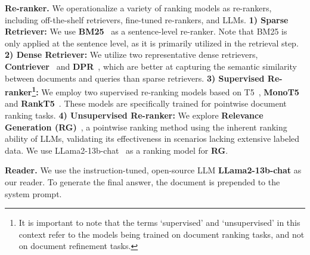 \noindent\textbf{Re-ranker.} 
We operationalize a variety of ranking models as re-rankers, including off-the-shelf retrievers, fine-tuned re-rankers, and LLMs.
\textbf{1) Sparse Retriever:} We use \textbf{BM25}~\cite{bm25} as a sentence-level re-ranker. Note that BM25 is only applied at the sentence level, as it is primarily utilized in the retrieval step.
\textbf{2) Dense Retriever:} We utilize two representative dense retrievers, \textbf{Contriever}~\cite{contriever} and \textbf{DPR}~\cite{DPR-karpukhin}, which are better at capturing the semantic similarity between documents and queries than sparse retrievers.
\textbf{3) Supervised Re-ranker\footnote{It is important to note that the terms `supervised' and `unsupervised' in this context refer to the models being trained on document ranking tasks, and not on document refinement tasks.\label{footnote}}:} We employ two supervised re-ranking models based on T5~\cite{T5}, \textbf{MonoT5}~\cite{monot5} and \textbf{RankT5}~\cite{rankt5}. These models are specifically trained for pointwise document ranking tasks.
\textbf{4) Unsupervised Re-ranker:}
We explore \textbf{Relevance Generation (RG)}~\cite{holistic}, a pointwise ranking method using the inherent ranking ability of LLMs, validating its effectiveness in scenarios lacking extensive labeled data.
We use LLama2-13b-chat~\cite{Llama2} as a ranking model for \textbf{RG}.


\noindent\textbf{Reader.}
We use the instruction-tuned, open-source LLM \textbf{LLama2-13b-chat} as our reader. To generate the final answer, the document is prepended to the system prompt.


